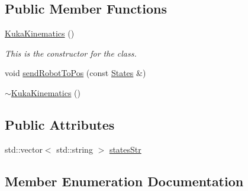 \subsection*{Public Member Functions}
\begin{DoxyCompactItemize}
\item 
\hyperlink{classKukaKinematics_a64b20280b0b2c7cb0e131b9652e4c226}{Kuka\+Kinematics} ()
\begin{DoxyCompactList}\small\item\em This is the constructor for the class. \end{DoxyCompactList}\item 
void \hyperlink{classKukaKinematics_af44437d7297d391c2142f9c18accf922}{send\+Robot\+To\+Pos} (const \hyperlink{classKukaKinematics_a89f02e319ae430af22785077d058fab7}{States} \&)
\item 
\hyperlink{classKukaKinematics_a4304862e32ad9e7013c592a3c067d185}{$\sim$\+Kuka\+Kinematics} ()
\end{DoxyCompactItemize}
\subsection*{Public Attributes}
\begin{DoxyCompactItemize}
\item 
std\+::vector$<$ std\+::string $>$ \hyperlink{classKukaKinematics_a31bb1782c3b25551fd4bf39b9d73aa1e}{states\+Str}
\end{DoxyCompactItemize}


\subsection{Member Enumeration Documentation}
